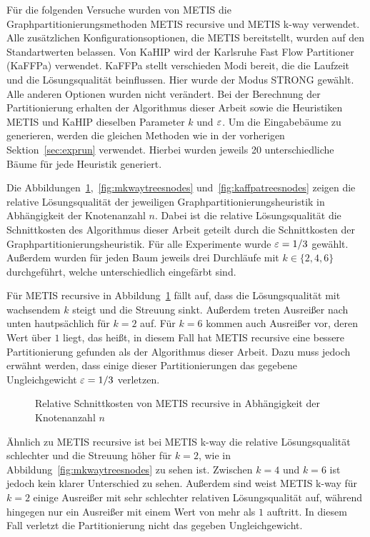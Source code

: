 Für die folgenden Versuche wurden von METIS die Graphpartitionierungsmethoden METIS recursive und METIS k-way verwendet.
Alle zusätzlichen Konfigurationsoptionen, die METIS bereitstellt, wurden auf den Standartwerten belassen.
Von KaHIP wird der Karlsruhe Fast Flow Partitioner (KaFFPa) verwendet.
KaFFPa stellt verschieden Modi bereit, die die Laufzeit und die Lösungsqualität beinflussen.
Hier wurde der Modus STRONG gewählt.
Alle anderen Optionen wurden nicht verändert.
Bei der Berechnung der Partitionierung erhalten der Algorithmus dieser Arbeit sowie die Heuristiken METIS und KaHIP dieselben Parameter $k$ und $\varepsilon$.
Um die Eingabebäume zu generieren, werden die gleichen Methoden wie in der vorherigen Sektion~\ref{sec:exprun} verwendet.
Hierbei wurden jeweils 20 unterschiedliche Bäume für jede Heuristik generiert.

Die Abbildungen~\ref{fig:mrectreesnodes},~\ref{fig:mkwaytreesnodes} und~\ref{fig:kaffpatreesnodes} zeigen die relative Lösungsqualität der jeweiligen Graphpartitionierungsheuristik in Abhängigkeit der Knotenanzahl $n$.
Dabei ist die relative Lösungsqualität die Schnittkosten des Algorithmus dieser Arbeit geteilt durch die Schnittkosten der Graphpartitionierungsheuristik.
Für alle Experimente wurde $\varepsilon=1/3$ gewählt.
Außerdem wurden für jeden Baum jeweils drei Durchläufe mit $k \in \{2, 4, 6\}$ durchgeführt, welche unterschiedlich eingefärbt sind.

Für METIS recursive in Abbildung~\ref{fig:mrectreesnodes} fällt auf, dass die Lösungsqualität mit wachsendem $k$ steigt und die Streuung sinkt.
Außerdem treten Ausreißer nach unten hautpsächlich für $k=2$ auf.
Für $k=6$ kommen auch Ausreißer vor, deren Wert über $1$ liegt, das heißt, in diesem Fall hat METIS recursive eine bessere Partitionierung gefunden als der Algorithmus dieser Arbeit.
Dazu muss jedoch erwähnt werden, dass einige dieser Partitionierungen das gegebene Ungleichgewicht $\varepsilon=1/3$ verletzen.

\begin{figure}[H]
    \centering
    
    \caption{Relative Schnittkosten von METIS recursive in Abhängigkeit der Knotenanzahl $n$\label{fig:mrectreesnodes}}
\end{figure}

Ähnlich zu METIS recursive ist bei METIS k-way die relative Lösungsqualität schlechter und die Streuung höher für $k=2$, wie in Abbildung~\ref{fig:mkwaytreesnodes} zu sehen ist.
Zwischen $k=4$ und $k=6$ ist jedoch kein klarer Unterschied zu sehen.
Außerdem sind weist METIS k-way für $k=2$ einige Ausreißer mit sehr schlechter relativen Lösungsqualität auf, während hingegen nur ein Ausreißer mit einem Wert von mehr als $1$ auftritt.
In diesem Fall verletzt die Partitionierung nicht das gegeben Ungleichgewicht.

